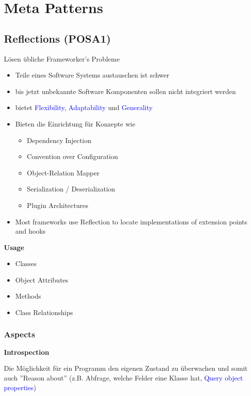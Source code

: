 \section{Meta Patterns}

\subsection{Reflections (POSA1)}

Lösen übliche Frameworker's Probleme

\begin{itemize}
    \item Teile eines Software Systems austauschen ist schwer
    \item bis jetzt unbekannte Software Komponenten sollen nicht integriert werden
    \item bietet \textcolor{blue}{Flexibility}, \textcolor{blue}{Adaptability} und \textcolor{blue}{Generality}
    \item Bieten die Einrichtung für Konzepte wie
    \begin{itemize}
        \item Dependency Injection
        \item Convention over Configuration
        \item Object-Relation Mapper
        \item Serialization / Deserialization
        \item Plugin Architectures
    \end{itemize}
    \item Most frameworks use Reflection to locate implementations of extension points and hooks
\end{itemize}
\vspace{10pt}
\textbf{Usage}
\begin{itemize}
    \item Classes
    \item Object Attributes
    \item Methods
    \item Class Relationships
\end{itemize}

\subsubsection{Aspects}

\textbf{Introspection}

Die Möglichkeit für ein Programm den eigenen Zustand zu überwachen und somit auch ''Reason about'' (z.B. Abfrage, welche Felder eine Klasse hat, \textcolor{blue}{Query object properties}) \\


